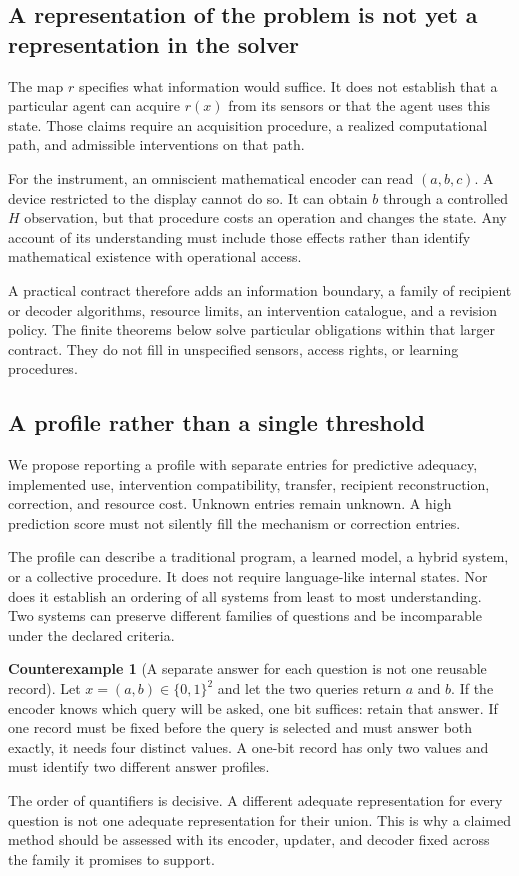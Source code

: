 \documentclass[11pt,letterpaper]{article}
\theoremstyle{plain}
\theoremstyle{definition}
\newtheorem{counterexample}[theorem]{Counterexample}
\begin{document}
\subsection{A representation of the problem is not yet a representation in the solver}
The map $r$ specifies what information would suffice. It does not establish that a particular agent can acquire $r(x)$ from its sensors or that the agent uses this state. Those claims require an acquisition procedure, a realized computational path, and admissible interventions on that path.

For the instrument, an omniscient mathematical encoder can read $(a,b,c)$. A device restricted to the display cannot do so. It can obtain $b$ through a controlled $H$ observation, but that procedure costs an operation and changes the state. Any account of its understanding must include those effects rather than identify mathematical existence with operational access.

A practical contract therefore adds an information boundary, a family of recipient or decoder algorithms, resource limits, an intervention catalogue, and a revision policy. The finite theorems below solve particular obligations within that larger contract. They do not fill in unspecified sensors, access rights, or learning procedures.

\subsection{A profile rather than a single threshold}
We propose reporting a profile with separate entries for predictive adequacy, implemented use, intervention compatibility, transfer, recipient reconstruction, correction, and resource cost. Unknown entries remain unknown. A high prediction score must not silently fill the mechanism or correction entries.

The profile can describe a traditional program, a learned model, a hybrid system, or a collective procedure. It does not require language-like internal states. Nor does it establish an ordering of all systems from least to most understanding. Two systems can preserve different families of questions and be incomparable under the declared criteria.

\begin{counterexample}[A separate answer for each question is not one reusable record]\label{ex:joint}
Let $x=(a,b)\in\{0,1\}^2$ and let the two queries return $a$ and $b$. If the encoder knows which query will be asked, one bit suffices: retain that answer. If one record must be fixed before the query is selected and must answer both exactly, it needs four distinct values. A one-bit record has only two values and must identify two different answer profiles.
\end{counterexample}
The order of quantifiers is decisive. A different adequate representation for every question is not one adequate representation for their union. This is why a claimed method should be assessed with its encoder, updater, and decoder fixed across the family it promises to support.
\end{document}

